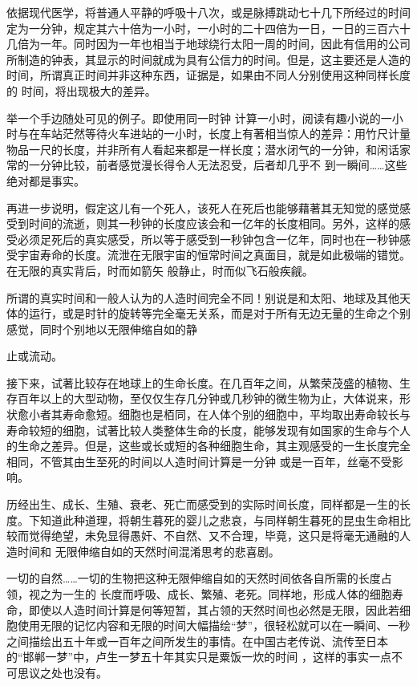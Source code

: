 \documentclass{article}
\begin{document}
依据现代医学，将普通人平静的呼吸十八次，或是脉搏跳动七十几下所经过的时间定为一分钟，规定其六十倍为一小时，一小时的二十四倍为一日，一日的三百六十几倍为一年。同时因为一年也相当于地球绕行太阳一周的时间，因此有信用的公司所制造的钟表，其显示的时间就成为具有公信力的时间。但是，这主要还是人造的时间，所谓真正时间并非这种东西，证据是，如果由不同人分别使用这种同样长度的
时间，将出现极大的差异。 

举一个手边随处可见的例子。即使用同一时钟
\newpage
计算一小时，阅读有趣小说的一小时与在车站茫然等待火车进站的一小时，长度上有著相当惊人的差异：用竹尺计量物品一尺的长度，并非所有人看起来都是一样长度；潜水闭气的一分钟，和闲话家常的一分钟比较，前者感觉漫长得令人无法忍受，后者却几乎不
到一瞬间……这些绝对都是事实。 

再进一步说明，假定这儿有一个死人，该死人在死后也能够藉著其无知觉的感觉感受到时间的流逝，则其一秒钟的长度应该会和一亿年的长度相同。另外，这样的感受必须足死后的真实感受，所以等于感受到一秒钟包含一亿年，同时也在一秒钟感受宇宙寿命的长度。流泄在无限宇宙的恒常时间之真面目，就是如此极端的错觉。在无限的真实背后，时而如箭矢
般静止，时而似飞石般疾觎。 

所谓的真实时间和一般人认为的人造时间完全不同！别说是和太阳、地球及其他天体的运行，或是时针的旋转等完全毫无关系，而是对于所有无边无量的生命之个别感觉，同时个别地以无限伸缩自如的静

\newpage
止或流动。 

接下来，试著比较存在地球上的生命长度。在几百年之间，从繁荣茂盛的植物、生存百年以上的大型动物，至仅仅生存几分钟或几秒钟的微生物为止，大体说来，形状愈小者其寿命愈短。细胞也是栢同，在人体个别的细胞中，平均取出寿命较长与寿命较短的细胞，试著比较人类整体生命的长度，能够发现有如国家的生命与个人的生命之差异。但是，这些或长或短的各种细胞生命，其主观感受的一生长度完全相同，不管其由生至死的时间以人造时间计算是一分钟
或是一百年，丝毫不受影响。 

历经出生、成长、生殖、衰老、死亡而感受到的实际时间长度，同样都是一生的长度。下知道此种道理，将朝生暮死的婴儿之悲哀，与同样朝生暮死的昆虫生命相比较而觉得绝望，未免显得愚奸、不自然、又不合理，毕竟，这只是将毫无通融的人造时间和
无限伸缩自如的天然时间混淆思考的悲喜剧。 

一切的自然……一切的生物把这种无限伸缩自如的天然时间依各自所需的长度占领，视之为一生的
\newpage
长度而呼吸、成长、繁殖、老死。同样地，形成人体的细胞寿命，即使以人造时间计算是何等短暂，其占领的天然时间也必然是无限，因此若细胞使用无限的记忆内容和无限的时间大幅描绘“梦”，很轻松就可以在一瞬间、一秒之间描绘出五十年或一百年之间所发生的事情。在中国古老传说、流传至日本的“邯郸一梦”中，卢生一梦五十年其实只是粟饭一炊的时间
，这样的事实一点不可思议之处也没有。 
\end{document}
